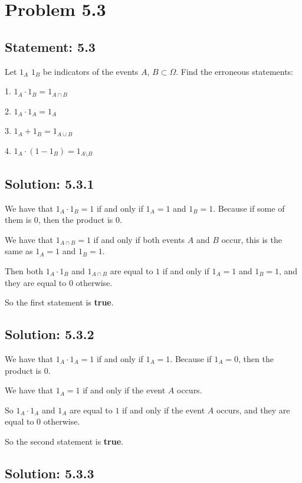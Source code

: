 \section*{Problem 5.3}

\subsection*{Statement: 5.3}

Let $1_A$ $1_B$ be indicators of the events $A$, $B \subset \Omega$. Find the erroneous statements:

1. $1_A \cdot 1_B = 1_{A\cap B}$

2. $1_A \cdot 1_A = 1_A$

3. $1_A + 1_B = 1_{A\cup B}$

4. $1_A \cdot (1 - 1_B) = 1_{A\setminus B}$


\subsection*{Solution: 5.3.1}

We have that $1_A \cdot 1_B = 1$ if and only if $1_A = 1$ and $1_B = 1$.
Because if some of them is $0$, then the product is $0$.


We have that $1_{A\cap B} = 1$ if and only if both events $A$ and $B$ occur, this
is the same as $1_A = 1$ and $1_B = 1$.

Then both $1_A \cdot 1_B$ and $1_{A\cap B}$ are equal to $1$ if and only if
$1_A = 1$ and $1_B = 1$, and they are equal to $0$ otherwise.

So the first statement is \textbf{true}.


\subsection*{Solution: 5.3.2}

We have that $1_A \cdot 1_A = 1$ if and only if $1_A = 1$.
Because if $1_A = 0$, then the product is $0$.

We have that $1_A = 1$ if and only if the event $A$ occurs.

So $1_A \cdot 1_A$ and $1_A$ are equal to $1$ if and only if the event $A$ occurs,
and they are equal to $0$ otherwise.

So the second statement is \textbf{true}.


\subsection*{Solution: 5.3.3}

